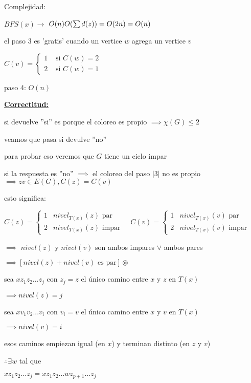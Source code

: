 \documentclass[12pt]{article}
\begin{document}
Complejidad:

$BFS(x) \rightarrow$ \(O(n) \\ O(\sum d(z)) = O(2n) = O(n) \)\bigskip

el paso 3 es 'gratis' cuando un vertice $w$ agrega un vertice $v$

\(C(v) =
\begin{cases}
1 & \text{ si } C(w) = 2 \\
2 & \text{ si } C(w) = 1
\end{cases}
\)\bigskip

paso 4: $O(n)$ \bigskip

\underline{\textbf{Correctitud:}}

si devuelve ''si'' es porque el coloreo es propio $\implies \chi(G) \leq 2$\bigskip

veamos que pasa si devulve ''no''

para probar eso veremos que $G$ tiene un ciclo impar\bigskip

si la respuesta es ''no'' $\implies$ el coloreo del paso $|3|$ no es propio \(\implies zv \in E(G), C(z) = C(v)\)\bigskip

esto significa:

\(
C(z) =
\begin{cases}
1 & nivel_{T(x)}(z) \text{ par} \\
2 & nivel_{T(x)}(z)\text{ impar}
\end{cases}
\hspace{1em}C(v) = 
\begin{cases}
1 & nivel_{T(x)}(v) \text{ par} \\
2 & nivel_{T(x)}(v)\text{ impar}
\end{cases}
\)\bigskip

$\implies$ $nivel(z)$ y $nivel(v)$ son ambos impares $\vee$ ambos pares

\(\implies[nivel(z) + nivel(v) \text{ es par}]\circledast\)\bigskip

sea $xz_{1}z_{2} ... z_{j}$ con $z_j = z$ el único camino entre $x$ y $z$ en $T(x)$

\(\implies nivel(z) = j \)\bigskip

sea $xv_{1}v_{2}...v_i$ con $v_i = v$ el único camino entre $x$ y $v$ en $T(x)$

\(\implies nivel(v) = i\)\bigskip

esos caminos empiezan igual (en $x$) y terminan distinto (en $z$ y $v$) 

$\therefore \exists w$ tal que 

$xz_{1}z_{2}...z_{j} = xz_{1}z_{2}...wz_{p+1}...z_{j}$ 
\end{document}
